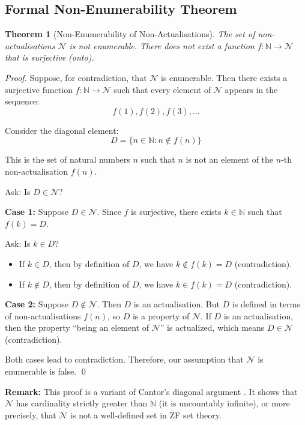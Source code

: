\documentclass[twocolumn,10pt]{article}
\newtheorem{theorem}{Theorem}[section]
\theoremstyle{definition}
\theoremstyle{remark}
\begin{document}
\subsection{Formal Non-Enumerability Theorem}

\begin{theorem}[Non-Enumerability of Non-Actualisations]
The set of non-actualisations $\mathcal{N}$ is not enumerable. There does not exist a function $f : \mathbb{N} \to \mathcal{N}$ that is surjective (onto).
\end{theorem}

\begin{proof}
Suppose, for contradiction, that $\mathcal{N}$ is enumerable. Then there exists a surjective function $f : \mathbb{N} \to \mathcal{N}$ such that every element of $\mathcal{N}$ appears in the sequence:
$$
f(1), f(2), f(3), \ldots
$$

Consider the diagonal element:
$$
D = \{n \in \mathbb{N} : n \notin f(n)\}
$$

This is the set of natural numbers $n$ such that $n$ is not an element of the $n$-th non-actualisation $f(n)$.

Ask: Is $D \in \mathcal{N}$?

\textbf{Case 1:} Suppose $D \in \mathcal{N}$. Since $f$ is surjective, there exists $k \in \mathbb{N}$ such that $f(k) = D$.

Ask: Is $k \in D$?

\begin{itemize}
\item If $k \in D$, then by definition of $D$, we have $k \notin f(k) = D$ (contradiction).
\item If $k \notin D$, then by definition of $D$, we have $k \in f(k) = D$ (contradiction).
\end{itemize}

\textbf{Case 2:} Suppose $D \notin \mathcal{N}$. Then $D$ is an actualisation. But $D$ is defined in terms of non-actualisations $f(n)$, so $D$ is a property of $\mathcal{N}$. If $D$ is an actualisation, then the property ``being an element of $\mathcal{N}$'' is actualized, which means $D \in \mathcal{N}$ (contradiction).

Both cases lead to contradiction. Therefore, our assumption that $\mathcal{N}$ is enumerable is false. \qed
\end{proof}

\textbf{Remark:} This proof is a variant of Cantor's diagonal argument \cite{cantor1891}. It shows that $\mathcal{N}$ has cardinality strictly greater than $\mathbb{N}$ (it is uncountably infinite), or more precisely, that $\mathcal{N}$ is not a well-defined set in ZF set theory.
\end{document}
